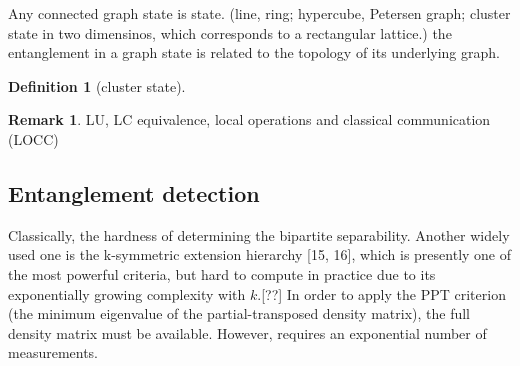\documentclass[
aps,
pra,
floatfix,
]{revtex4-2}
\theoremstyle{plain}
\newtheorem{question}{Question}
\theoremstyle{definition}
\newtheorem{definition}{Definition}
\newtheorem{observation}{Observation}
\newtheorem{example}{Example}
\newtheorem{remark}{Remark}
\newtheorem{problem}{Problem}
\newcommand{\U}{\hat{U}}
\newcommand{\dm}{\rho}
\begin{document}
	Any connected graph state is  state.
	(line, ring; 
	hypercube, Petersen graph; 
	cluster state in two dimensinos, which corresponds to a rectangular lattice.)
	\cite{heinEntanglementGraphStates2006}
	the entanglement in a graph state is related to the topology of its underlying graph.
\begin{definition}[cluster state]\label{def:cluster_state}
\end{definition}
\begin{remark}
	LU, LC equivalence, local operations and classical communication (LOCC)
\end{remark}



\subsection{Entanglement detection}
Classically, the hardness of determining the bipartite separability.
Another widely used one is the k-symmetric extension hierarchy [15, 16], which is presently one of the most powerful criteria, but hard to compute in practice due to its exponentially growing complexity with $k$.[??]
In order to apply the PPT criterion (the minimum eigenvalue of the partial-transposed density matrix), the full density matrix must be available. However,  requires an exponential number of measurements.
\end{document}

